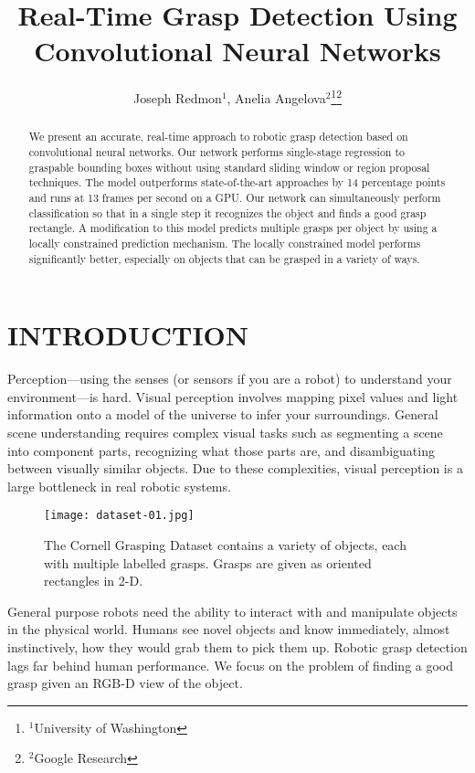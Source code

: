 \documentclass[letterpaper, 10 pt, conference]{ieeeconf}
\title{\LARGE \bf
Real-Time Grasp Detection Using Convolutional Neural Networks
}
\author{Joseph Redmon$^{1}$, Anelia Angelova$^{2}$\thanks{$^{1}$University of Washington}\thanks{$^{2}$Google Research}}
\begin{document}
\maketitle
\thispagestyle{empty}
\pagestyle{empty}


\begin{abstract}

We present an accurate, real-time approach to robotic grasp detection based on convolutional neural networks. Our network performs single-stage regression to graspable bounding boxes without using standard sliding window or region proposal techniques. The model outperforms state-of-the-art approaches by 14 percentage points and runs at 13 frames per second on a GPU. Our network can simultaneously perform classification so that in a single step it recognizes the object and finds a good grasp rectangle. A modification to this model predicts multiple grasps per object by using a locally constrained prediction mechanism. The locally constrained model performs significantly better, especially on objects that can be grasped in a variety of ways.
\end{abstract}


\section{INTRODUCTION}

Perception---using the senses (or sensors if you are a robot) to understand your environment---is hard. Visual perception involves mapping pixel values and light information onto a model of the universe to infer your surroundings. General scene understanding requires complex visual tasks such as segmenting a scene into component parts, recognizing what those parts are, and disambiguating between visually similar objects. Due to these complexities, visual perception is a large bottleneck in real robotic systems.
   \begin{figure}[hbtp]
      \centering
        \texttt{[image: dataset-01.jpg]}
      \caption{The Cornell Grasping Dataset contains a variety of objects, each with multiple labelled grasps. Grasps are given as oriented rectangles in 2-D.}
      \label{dataset}
   \end{figure}


General purpose robots need the ability to interact with and manipulate objects in the physical world. Humans see novel objects and know immediately, almost instinctively, how they would grab them to pick them up. Robotic grasp detection lags far behind human performance. We focus on the problem of finding a good grasp given an RGB-D view of the object.
\end{document}
